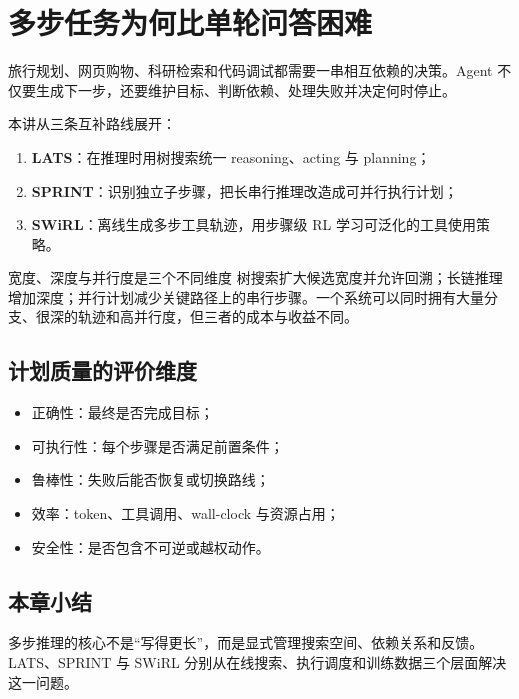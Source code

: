 \section{多步任务为何比单轮问答困难}

旅行规划、网页购物、科研检索和代码调试都需要一串相互依赖的决策。Agent 不仅要生成下一步，还要维护目标、判断依赖、处理失败并决定何时停止。


本讲从三条互补路线展开：

\begin{enumerate}
    \item \textbf{LATS}：在推理时用树搜索统一 reasoning、acting 与 planning；
    \item \textbf{SPRINT}：识别独立子步骤，把长串行推理改造成可并行执行计划；
    \item \textbf{SWiRL}：离线生成多步工具轨迹，用步骤级 RL 学习可泛化的工具使用策略。
\end{enumerate}

\begin{importantbox}{宽度、深度与并行度是三个不同维度}
树搜索扩大候选宽度并允许回溯；长链推理增加深度；并行计划减少关键路径上的串行步骤。一个系统可以同时拥有大量分支、很深的轨迹和高并行度，但三者的成本与收益不同。
\end{importantbox}

\subsection{计划质量的评价维度}

\begin{itemize}
    \item 正确性：最终是否完成目标；
    \item 可执行性：每个步骤是否满足前置条件；
    \item 鲁棒性：失败后能否恢复或切换路线；
    \item 效率：token、工具调用、wall-clock 与资源占用；
    \item 安全性：是否包含不可逆或越权动作。
\end{itemize}

\subsection{本章小结}

多步推理的核心不是“写得更长”，而是显式管理搜索空间、依赖关系和反馈。LATS、SPRINT 与 SWiRL 分别从在线搜索、执行调度和训练数据三个层面解决这一问题。

